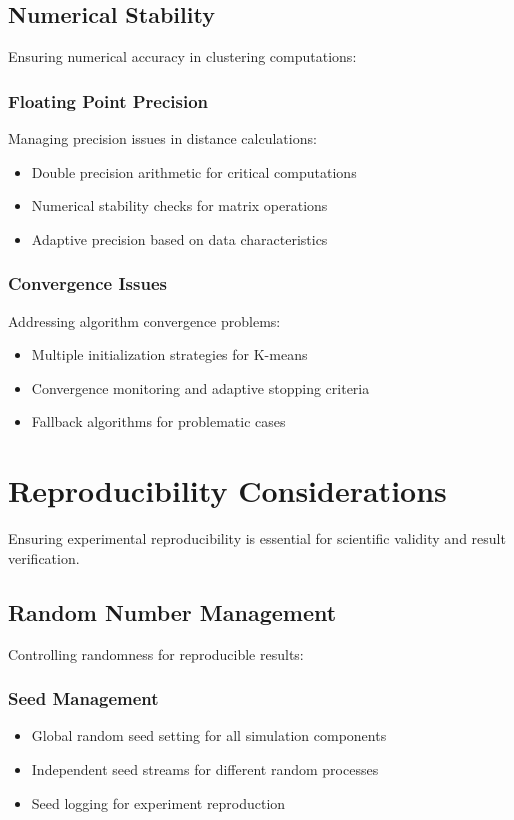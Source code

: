\subsection{Numerical Stability}
Ensuring numerical accuracy in clustering computations:

\subsubsection{Floating Point Precision}
Managing precision issues in distance calculations:
\begin{itemize}
\item Double precision arithmetic for critical computations
\item Numerical stability checks for matrix operations
\item Adaptive precision based on data characteristics
\end{itemize}

\subsubsection{Convergence Issues}
Addressing algorithm convergence problems:
\begin{itemize}
\item Multiple initialization strategies for K-means
\item Convergence monitoring and adaptive stopping criteria
\item Fallback algorithms for problematic cases
\end{itemize}

\section{Reproducibility Considerations}
Ensuring experimental reproducibility is essential for scientific validity and result verification.

\subsection{Random Number Management}
Controlling randomness for reproducible results:

\subsubsection{Seed Management}
\begin{itemize}
\item Global random seed setting for all simulation components
\item Independent seed streams for different random processes
\item Seed logging for experiment reproduction
\end{itemize}

